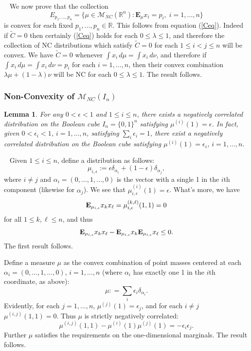 \documentclass[11pt]{article}
\newcommand{\E}{\mathbf{E}}
\newcommand{\R}{\mathbb{R}}
\newcommand{\m}{\mathcal{M}}
\newtheorem{lemma}{Lemma}
\newenvironment{Proof}{\noindent{\bf Proof} \ }{\QED}\smallskip
\newcommand\QED{\newline \rightline{$\blacksquare$} \bigskip}
\begin{document}
\begin{Proof}
We now prove that the collection 
\[
E_{p_1,\dots,p_n} = \{\mu\in \m_{NC}(\R^n) : \E_{\mu} x_i = p_i,\; i=1,\dots,n\}
\]
is convex for each fixed $p_1,\dots, p_n \in \R$. This follows from equation (\ref{Ceq}). Indeed if $\tilde{C}=0$ then certainly (\ref{Ceq}) holds for each $0\leq \lambda\leq 1$, and therefore the collection of NC distributions which satisfy $\tilde{C}=0$ for each $1\leq i<j\leq n$ will be convex. We have $\tilde{C}=0$ whenever $\int x_i\, d\mu = \int x_i \, d\nu$, and therefore if $\int x_i\, d\mu = \int x_i \, d\nu=p_i$ for each $i=1,\dots, n$, then their convex combination $\lambda \mu + (1-\lambda)\nu$ will be NC for each $0\leq \lambda\leq 1$. The result follows. 
\end{Proof}

\subsubsection{Non-Convexity of $\m_{NC}(I_n)$}
\begin{lemma}\label{NCmarginal}
For any $0<\epsilon<1$ and $1\leq i\leq n$, there exists a negatively correlated  distribution on the Boolean cube $I_n=\{0,1\}^n$ satisfying $\mu^{(i)}(1)=\epsilon$. In fact, given $0<\epsilon_i<1$, $i=1,\dots, n$, satisfying $\sum_i \epsilon_i=1$, there exist a negatively correlated distribution on the Boolean cube satisfying $\mu^{(i)}(1)= \epsilon_i$, $i=1,\dots, n$.
\end{lemma}

\begin{Proof}
Given $1\leq i\leq n$, define a distribution as follows:
\[
\mu_{i,\epsilon} := \epsilon\delta_{\alpha_i} +(1-\epsilon)\delta_{\alpha_j},
\]
where $i\neq j$ and ${ \alpha_i} = (0,\dots,1,\dots,0)$ is the vector with a single 1 in the $i$th component (likewise for $\alpha_j$). We see that $\mu^{(i)}_{i,\epsilon}(1) =\epsilon$. What's more, we have
\[
{\bf E}_{\mu_{i,\epsilon}} x_{k}x_{\ell} =\mu^{(k,\ell)}_{i,\epsilon}(1,1)= 0
\]
for all $1\leq k,\ell \leq n$, and thus
\[
{\bf E}_{\mu_{i,\epsilon}} x_{k}x_{\ell} - {\bf E}_{\mu_{i,\epsilon}} x_k{\bf E}_{\mu_{i,\epsilon}} x_{\ell} \leq 0.
\]
The first result follows.

Define a measure $\mu$ as the convex combination of point masses centered at each $\alpha_i =(0,\dots, 1,\dots, 0)$, $i=1,\dots, n$ (where $\alpha_i$ has exactly one 1 in the $i$th coordinate, as above):
\[
\mu : = \sum_ i \epsilon_i \delta_{\alpha_i}.
\]
Evidently, for each $j=1,\dots, n$, $\mu^{(j)}(1) =\epsilon_j$, and for each $i\neq j$ $\mu^{(i,j)}(1,1) = 0$. Thus $\mu$ is strictly negatively correlated:
\[
\mu^{(i,j)}(1,1) - \mu^{(i)}(1)\mu^{(j)}(1) = -\epsilon_i\epsilon_j.
\]
Further $\mu$ satisfies the requirements on the one-dimensional marginals. The result follows.
\end{Proof}
\end{document}
